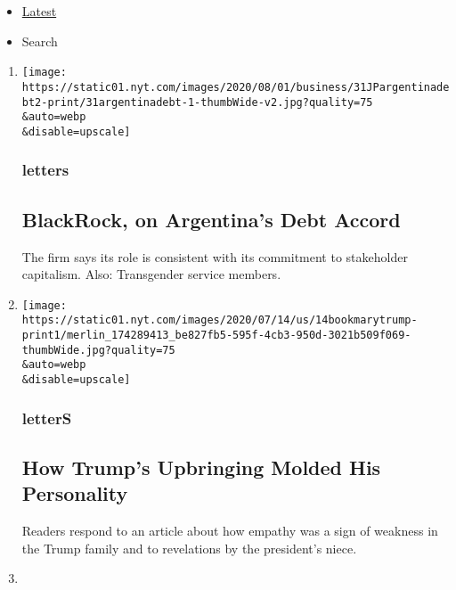 \begin{itemize}
\tightlist
\item
  \protect\hyperlink{stream-panel}{Latest}
\item
  Search
\end{itemize}

\begin{enumerate}
\def\labelenumi{\arabic{enumi}.}
\item
  \href{/2020/08/04/opinion/letters/blackrock-argentina.html}{}

  \texttt{[image: https://static01.nyt.com/images/2020/08/01/business/31JPargentinadebt2-print/31argentinadebt-1-thumbWide-v2.jpg?quality=75\\\&auto=webp\\\&disable=upscale]}

  \hypertarget{letters}{%
  \subsubsection{letters}\label{letters}}

  \hypertarget{blackrock-on-argentinas-debt-accord}{%
  \subsection{BlackRock, on Argentina's Debt
  Accord}\label{blackrock-on-argentinas-debt-accord}}

  The firm says its role is consistent with its commitment to
  stakeholder capitalism. Also: Transgender service members.
\item
  \href{/2020/08/04/opinion/letters/trump-family.html}{}

  \texttt{[image: https://static01.nyt.com/images/2020/07/14/us/14bookmarytrump-print1/merlin\_174289413\_be827fb5-595f-4cb3-950d-3021b509f069-thumbWide.jpg?quality=75\\\&auto=webp\\\&disable=upscale]}

  \hypertarget{letters-1}{%
  \subsubsection{letterS}\label{letters-1}}

  \hypertarget{how-trumps-upbringing-molded-his-personality}{%
  \subsection{How Trump's Upbringing Molded His
  Personality}\label{how-trumps-upbringing-molded-his-personality}}

  Readers respond to an article about how empathy was a sign of weakness
  in the Trump family and to revelations by the president's niece.
\item
  \href{/2020/08/04/opinion/opioid-telemedicine-covid.html}{}


\end{enumerate}
